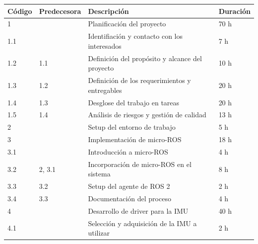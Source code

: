 \documentclass[
11pt, %
codirector, %
]{charter}
\begin{document}
\begin{table}[htpb]
\centering
\label{tab:wbs}
\begin{tabular}{@{}llll@{}}
\toprule
\textbf{Código} & \textbf{Predecesora} & \textbf{Descripción}                               & \textbf{Duración} \\ \midrule
1               &                      & Planificación del proyecto                         & 70 h               \\
1.1             &                      & Identifiación y contacto con los interesados       & 7 h                \\
1.2             & 1.1                  & Definición del propósito y alcance del proyecto    & 10 h               \\
1.3             & 1.2                  & Definición de los requerimientos y entregables     & 20 h               \\
1.4             & 1.3                  & Desglose del trabajo en tareas                     & 20 h               \\
1.5             & 1.4                  & Análisis de riesgos y gestión de calidad           & 13 h               \\
2               &                      & Setup del entorno de trabajo                       & 5 h                \\
3               &                      & Implementación de micro-ROS                        & 18 h               \\
3.1             &                      & Introducción a micro-ROS                           & 4 h                \\
3.2             & 2, 3.1               & Incorporación de micro-ROS en el sistema           & 8 h                \\
3.3             & 3.2                  & Setup del agente de ROS 2                          & 2 h                \\
3.4             & 3.3                  & Documentación del proceso                          & 4 h                \\
4               &                      & Desarrollo de driver para la IMU                   & 40 h               \\
4.1             &                      & Selección y adquisición de la IMU a utilizar       & 2 h                \\

\end{tabular}
\end{table}
\end{document}
